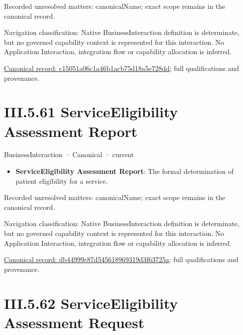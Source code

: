 {\small Recorded unresolved matters: canonicalName; exact scope remains in the canonical record.}\par
{\small Navigation classification: Native BusinessInteraction definition is determinate, but no governed capability context is represented for this interaction. No Application Interaction, integration flow or capability allocation is inferred.}\par
{\footnotesize \href{../../../../../../../continuum/business/business-interaction/c15051a06c1a46b1acb75d18a5e728dd.md}{Canonical record: c15051a06c1a46b1acb75d18a5e728dd}; full qualifications and provenance.}\par
\section*{III.5.61 ServiceEligibility Assessment Report}
\label{navigation:III.5.61}

\label{element:db44999c87d545618969319d3f63725a}
{\small BusinessInteraction · Canonical · current}\par

\begin{itemize}


\item \textbf{ServiceEligibility Assessment Report}: The formal determination of patient eligibility for a service.

\end{itemize}

{\small Recorded unresolved matters: canonicalName; exact scope remains in the canonical record.}\par
{\small Navigation classification: Native BusinessInteraction definition is determinate, but no governed capability context is represented for this interaction. No Application Interaction, integration flow or capability allocation is inferred.}\par
{\footnotesize \href{../../../../../../../continuum/business/business-interaction/db44999c87d545618969319d3f63725a.md}{Canonical record: db44999c87d545618969319d3f63725a}; full qualifications and provenance.}\par
\section*{III.5.62 ServiceEligibility Assessment Request}
\label{navigation:III.5.62}

